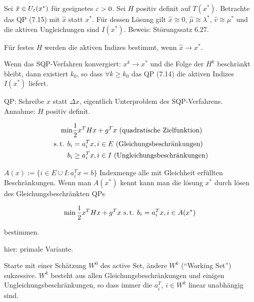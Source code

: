 Sei $\hat x \in U_\varepsilon (x^*)$ für geeignetes $\varepsilon>0$. Sei $H$ positiv definit auf $T(x^*)$. Betrachte das QP (7.15) mit $\hat x$ statt $x^*$. Für dessen Lösung gilt $\hat x \cong 0$, $\hat \mu \cong \lambda^*$, $\hat v \cong \mu^*$ und die aktiven Ungleichungen sind $I(x^*)$. Beweis: Störungssatz 6.27.


\bitm
\item Für festes $H$ werden die aktiven Indizes bestimmt, wenn $\hat x \to x^*$.
\item Wenn das SQP-Verfahren konvergiert: $x^k \to x^*$ und die Folge der $H^k$ beschränkt bleibt, dann existiert $k_0$, so dass $\forall k \geq k_0$ das QP (7.14) die aktiven Indizes $I(x^*)$ liefert.
\eitm


QP: Schreibe $x$ statt $\Delta x$, eigentlich Unterproblem des SQP-Verfahrens. Annahme: $H$ positiv definit.

\begin{align*}
\min &\frac 12 x^T H x + g^T x \text{ (quadratische Zielfunktion)} \\
\text{ s.\,t. } b_i &= a_i^T x, i \in E \text{ (Gleichungsbeschränkungen)} \\
b_i &\geq a_i^T x, i \in I \text{ (Ungleichungsbeschränkungen)} \\
\end{align*}

$A(x) := \{ i \in E \cup I : a_i^T x = b \}$ Indexmenge alle mit Gleichheit erfüllten Beschränkungen. Wenn man $A(x^*)$ kennt kann man die lösung $x^*$ durch lösen des Gleichungsbeschränkten QPs

\[ \min \frac 12 x^T H x + g^T x \text{ s.\,t. } b_i = a_i^T x, i \in A(x^*) \]

bestimmen.


hier: primale Variante.

Starte mit einer Schätzung $W^0$ des active Set, ändere $W^k$ ("`Working Set"') sukzessive. $W^k$ besteht aus allen Gleichungsbeschränkungen und einigen Ungleichungsbeschränkungen, so dass immer die $a_i^T$, $i \in W^k$ linear unabhängig sind.


























